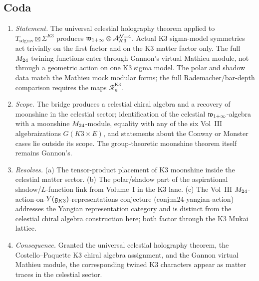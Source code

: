 \subsection*{Coda}

\begin{enumerate}
\item \emph{Statement.} The universal
celestial holography theorem applied to
$T_{\mathrm{sd grav}} \boxtimes \Sigma^{K3}$ produces
$\mathfrak w_{1+\infty} \otimes \mathcal A^{\mathcal{N}{=}4}_{K3}$. Actual K3 sigma-model
symmetries act trivially on the first factor and on the K3 matter
factor only. The full $M_{24}$ twining functions enter through
Gannon's virtual Mathieu module, not through a geometric action on one
K3 sigma model. The polar and shadow data match the Mathieu mock
modular forms; the full Rademacher/bar-depth comparison requires the
maps \(\mathcal R_n^{\mathrm{K3}}\).

\item \emph{Scope.} The bridge produces a celestial chiral algebra and
a recovery of moonshine in the celestial sector; identification of the
celestial $\mathfrak w_{1+\infty}$-algebra with a moonshine $M_{24}$-module, equality
with any of the six Vol~III algebraizations
$G(K3 \times E)$, and statements about the Conway or Monster cases lie
outside its scope. The group-theoretic moonshine theorem itself
remains Gannon's.

\item \emph{Resolves.}
(a) The tensor-product placement of K3 moonshine inside the celestial
matter sector.
(b) The polar/shadow part of the aspirational shadow/$L$-function link
from Volume~I in the K3 lane.
(c) The Vol~III $M_{24}$-action-on-$Y(\mathfrak g_{K3})$-representations
conjecture (conj:m24-yangian-action) addresses the Yangian
representation category and is distinct from the celestial chiral
algebra construction here; both factor through the K3 Mukai lattice.

\item \emph{Consequence.} Granted the universal celestial
holography theorem, the Costello--Paquette K3 chiral algebra assignment,
and the Gannon virtual Mathieu module, the corresponding twined K3
characters appear as matter traces in the celestial sector.
\end{enumerate}

